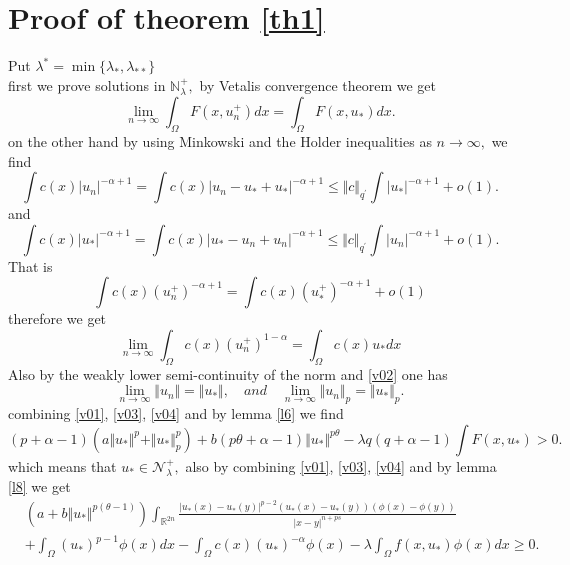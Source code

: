 \documentclass[10pt,twoside,reqno,centertags,draft]{amsart}
\begin{document}
\section{Proof of theorem \ref{th1}}
Put $ \lambda^{*} =\min\{ \lambda_{*}, \lambda_{**}\}$\\
first we prove solutions in $ \mathbb{N}_{\lambda}^{+},$ by Vetalis convergence theorem we get 
\begin{equation}\label{v01}
\lim_{n \to \infty}\int_{\Omega}F(x,u_n^+)dx =\int_{\Omega}F(x,u_*)dx.
\end{equation}
on the other hand by using Minkowski and the Holder inequalities as $ n \to \infty,$ we find
\begin{equation*}
\int c(x)\vert u_n\vert^{-\alpha+1} =\int c(x)\vert u_n -u_* +u_*\vert^{-\alpha+1} \leq \Vert c \Vert_{q^{\prime}}\int \vert u_*\vert^{-\alpha +1} +o(1).
\end{equation*}
and 
\begin{equation*}
\int c(x)\vert u_*\vert^{-\alpha+1} =\int c(x)\vert u_* -u_n +u_n\vert^{-\alpha+1} \leq \Vert c \Vert_{q^{\prime}}\int \vert u_n\vert^{-\alpha +1} +o(1).
\end{equation*}
That is 
\begin{equation}\label{e02}
\int c(x)(u_n^+)^{-\alpha+1} =\int c(x)(u_*^+)^{-\alpha+1} +o(1)
\end{equation}
therefore we get
\begin{equation}\label{v03}
\lim_{n \to \infty}\int_{\Omega}c(x)(u_n^+)^{1 -\alpha} =\int_{\Omega}c(x)u_*dx
\end{equation}
Also by the weakly lower semi-continuity of the norm and \ref{v02} one has
\begin{equation}\label{v04}
\lim_{n \to \infty}\Vert u_n\Vert =\Vert u_*\Vert, \quad \textit{and} \quad \lim_{n \to \infty}\Vert u_n\Vert_{p} =\Vert u_*\Vert_{p}. 
\end{equation}
combining \ref{v01}, \ref{v03}, \ref{v04} and by lemma \ref{l6} we find
\begin{equation*}
(p +\alpha -1) \left(a\Vert u_* \Vert^p + \Vert u_* \Vert_{p}^{p}\right) + b(p \theta +\alpha -1)\Vert u_* \Vert^{p \theta} - \lambda q (q +\alpha -1) \int F(x,u_*) >0.
\end{equation*}
which means that $ u_* \in \mathcal{N}_{\lambda}^{+},$ also by combining \ref{v01}, \ref{v03}, \ref{v04} and by lemma \ref{l8} we get 
\begin{equation*}
\begin{aligned}
& \left(a +b\Vert u_* \Vert^{p(\theta -1)}\right) \int_{\mathbb{R}^{2n}} \frac{\vert u_*(x) - u_*(y) \vert^{p-2}(u_*(x) - u_*(y))(\phi(x) - \phi(y))}{\vert x-y \vert^{n + ps}}\\
& + \int_{\Omega}(u_*)^{p -1} \phi(x) dx  - \int_{\Omega} c(x) (u_*)^{-\alpha} \phi(x) - 
\lambda \int_{\Omega} f(x,u_*) \phi(x)dx \geq 0.
\end{aligned}
\end{equation*}
\end{document}
